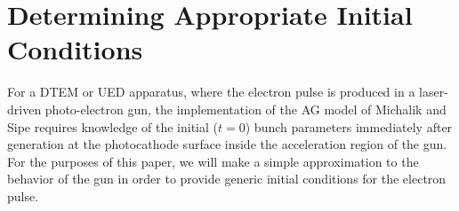 
\section{Determining Appropriate Initial Conditions} \label{sec:initial_conditions}
For a DTEM or UED apparatus, where the electron pulse is produced in a laser-driven photo-electron gun, the implementation of the AG model of Michalik and Sipe \cite{michalik_analytic_2006} requires knowledge of the initial ($ t = 0 $) bunch parameters immediately after generation at the photocathode surface inside the acceleration region of the gun.
For the purposes of this paper, we will make a simple approximation to the behavior of the gun in order to provide generic initial conditions for the electron pulse.

